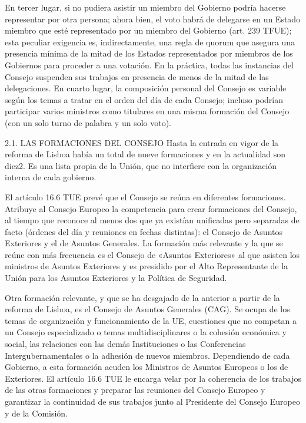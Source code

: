 \documentclass[10pt,a4paper]{article}
\begin{document}
En tercer lugar, si no pudiera asistir un miembro del Gobierno podría hacerse representar por otra persona; ahora bien, el voto habrá de delegarse en un Estado miembro que esté representado por un miembro del Gobierno (art. 239 TFUE); esta peculiar exigencia es, indirectamente, una regla de quorum que asegura una presencia mínima de la mitad de los Estados representados por miembros de los Gobiernos para proceder a una votación. En la práctica, todas las instancias del Consejo suspenden sus trabajos en presencia de menos de la mitad de las delegaciones. En cuarto lugar, la composición personal del Consejo es variable según los temas a tratar en el orden del día de cada Consejo; incluso podrían participar varios ministros como titulares en una  misma formación del Consejo (con un solo turno de palabra y un solo voto).

2.1. LAS FORMACIONES DEL CONSEJO
Hasta la entrada en vigor de la reforma de Lisboa había un total de nueve formaciones y en la actualidad son diez2. Es una lista propia de la Unión, que no interfiere con la organización interna de cada gobierno. 

El artículo 16.6 TUE prevé que el Consejo se reúna en diferentes formaciones. Atribuye al Consejo Europeo la competencia para crear formaciones del Consejo, al tiempo que reconoce al menos dos que ya existían unificadas pero separadas de facto (órdenes del día y reuniones en fechas distintas): el Consejo de Asuntos Exteriores y el de Asuntos Generales. La formación más relevante y la que se reúne con más frecuencia es el Consejo de «Asuntos Exteriores» al que asisten los ministros de Asuntos Exteriores y es presidido por el Alto Representante de la Unión para los Asuntos Exteriores y la Política de Seguridad.

Otra formación relevante, y que se ha desgajado de la anterior a partir de la reforma de Lisboa, es el Consejo de Asuntos Generales (CAG). Se ocupa de los temas de organización y funcionamiento de la UE, cuestiones que no competan a un Consejo especializado o temas multidisciplinares o la cohesión económica y social, las relaciones con las demás Instituciones o las Conferencias Intergubernamentales o la adhesión de nuevos miembros. Dependiendo de cada Gobierno, a esta formación acuden los Ministros de Asuntos Europeos o los de Exteriores. El artículo 16.6 TUE le encarga velar por la coherencia de los trabajos de las otras formaciones y preparar las reuniones del Consejo Europeo y garantizar la continuidad de sus trabajos junto al Presidente del Consejo Europeo y de la Comisión.
\end{document}
